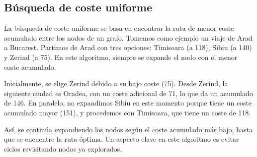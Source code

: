 \documentclass[tikz,11pt,fleqn]{book} %
\begin{document}
\subsection{Búsqueda de coste uniforme}




La búsqueda de coste uniforme se basa en encontrar la ruta de menor coste acumulado entre los nodos de un grafo. Tomemos como ejemplo un viaje de Arad a Bucarest. Partimos de Arad con tres opciones: Timisoara (a 118), Sibiu (a 140) y Zerind (a 75). En este algoritmo, siempre se expande el nodo con el menor coste acumulado.

Inicialmente, se elige Zerind debido a su bajo coste (75). Desde Zerind, la siguiente ciudad es Oradea, con un coste adicional de 71, lo que da un acumulado de 146. En paralelo, no expandimos Sibiu en este momento porque tiene un coste acumulado mayor (151), y procedemos con Timisoara, que tiene un coste de 118.

Así, se continúa expandiendo los nodos según el coste acumulado más bajo, hasta que se encuentre la ruta óptima. Un aspecto clave en este algoritmo es evitar ciclos revisitando nodos ya explorados.
\end{document}
